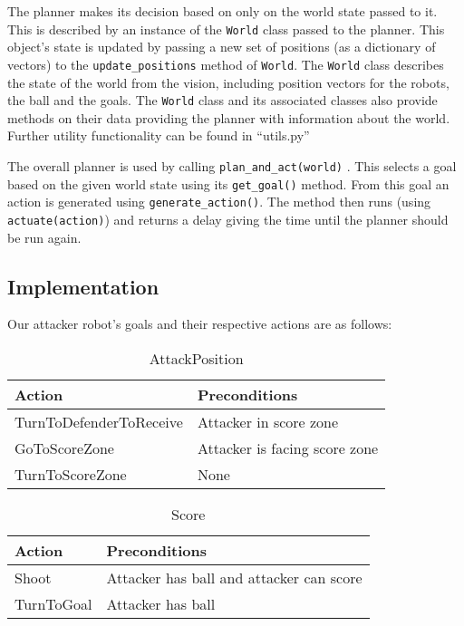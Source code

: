 The planner makes its decision based on only on the world state passed to it. This is described by an instance of the \lstinline|World| class passed to the planner. This object's state is updated by passing a new set of positions (as a dictionary of vectors) to the \lstinline|update_positions| method of \lstinline|World|. The \lstinline|World| class describes the state of the world from the vision, including position vectors for the robots, the ball and the goals. The \lstinline|World| class and its associated classes also provide methods on their data providing the planner with information about the world. Further utility functionality can be found in ``utils.py''

The overall planner is used by calling \lstinline|plan_and_act(world)|
. This selects a goal based on the given world state  using its \lstinline|get_goal()| method. From this goal an action is generated using \lstinline|generate_action()|. The method then runs (using \lstinline|actuate(action)|) and returns a delay giving the time until the planner should be run again.

\subsection{Implementation}

Our attacker robot's goals and their respective actions are as follows:

\begin{table}[H]
\centering
\caption{AttackPosition}
\begin{tabular}{ | l | l | }
\hline
Action & Preconditions \\ \hline
TurnToDefenderToReceive & Attacker in score zone \\ \hline
GoToScoreZone & Attacker is facing score zone  \\ \hline
TurnToScoreZone & None \\
\hline
\end{tabular}
\end{table}


\begin{table}[H]
\centering
\caption{Score}
\begin{tabular}{ | l | l | }
\hline
Action & Preconditions \\ \hline
Shoot & Attacker has ball and attacker can score \\ \hline
TurnToGoal & Attacker has ball \\
\hline
\end{tabular}
\end{table}


